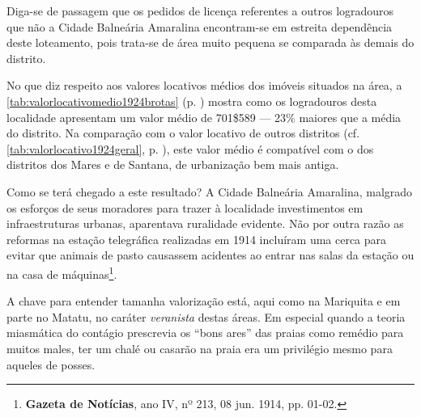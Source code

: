 



Diga-se de passagem que os pedidos de licença referentes a outros logradouros que não a Cidade Balneária Amaralina encontram-se em estreita dependência deste loteamento, pois trata-se de área muito pequena se comparada às demais do distrito.


No que diz respeito aos valores locativos médios dos imóveis situados na área, a \autoref{tab:valorlocativomedio1924brotas} (p. \pageref{tab:valorlocativomedio1924brotas}) mostra como os logradouros desta localidade apresentam um valor médio de 701\$589 --- 23\% maiores que a média do distrito. Na comparação com o valor locativo de outros distritos (cf. \autoref{tab:valorlocativo1924geral}, p. \pageref{tab:valorlocativo1924geral}), este valor médio é compatível com o dos distritos dos Mares e de Santana, de urbanização bem mais antiga.


Como se terá chegado a este resultado? A Cidade Balneária Amaralina, malgrado os esforços de seus moradores para trazer à localidade investimentos em infraestruturas urbanas, aparentava ruralidade evidente. Não por outra razão as reformas na estação telegráfica realizadas em 1914 incluíram uma cerca para evitar que animais de pasto causassem acidentes ao entrar nas salas da estação ou na casa de máquinas\footnote{\textbf{Gazeta de Notícias}, ano IV, nº 213, 08 jun. 1914, pp. 01-02.}.

A chave para entender tamanha valorização está, aqui como na Mariquita e em parte no Matatu, no caráter \textit{veranista} destas áreas. Em especial quando a teoria miasmática do contágio prescrevia os ``bons ares'' das praias como remédio para muitos males, ter um chalé ou casarão na praia era um privilégio mesmo para aqueles de posses.

